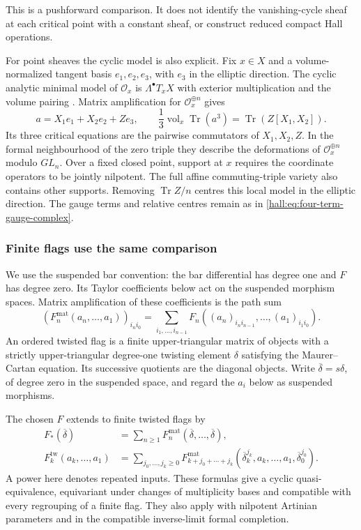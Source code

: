 This is a pushforward comparison. It does not identify the
vanishing-cycle sheaf at each critical point with a constant
sheaf, or construct reduced compact Hall operations.

For point sheaves the cyclic model is also explicit. Fix
$x\in X$ and a volume-normalized tangent basis $e_1,e_2,e_3$,
with $e_3$ in the elliptic direction. The cyclic analytic minimal
model of $\mathcal O_x$ is $\Lambda^\bullet T_xX$ with exterior
multiplication and the volume pairing
\cite[Theorem~4.23 and Proposition~5.18]{VanGarderenCyclic}.
Matrix amplification for $\mathcal O_x^{\oplus n}$ gives
\[
 a=X_1e_1+X_2e_2+Ze_3,\qquad
 \frac13\operatorname{vol}_x\operatorname{Tr}(a^3)
       =\operatorname{Tr}(Z[X_1,X_2]).
\]
Its three critical equations are the pairwise commutators of
$X_1,X_2,Z$. In the formal neighbourhood of the zero triple they
describe the deformations of $\mathcal O_x^{\oplus n}$ modulo
$GL_n$. Over a fixed closed point, support at $x$ requires the
coordinate operators to be jointly nilpotent. The full affine
commuting-triple variety also contains other supports.
Removing $\operatorname{Tr}Z/n$ centres this local model in the
elliptic direction. The gauge terms and relative centres remain
as in \eqref{hall:eq:four-term-gauge-complex}.

\subsubsection*{Finite flags use the same comparison}

We use the suspended bar convention: the bar differential has degree
one and $F$ has degree zero. Its Taylor coefficients below act on
the suspended morphism spaces. Matrix amplification of these
coefficients is the path sum
\[
 (F_n^{\mathrm{mat}}(a_n,\ldots,a_1))_{i_ni_0}
 =\sum_{i_1,\ldots,i_{n-1}}
 F_n((a_n)_{i_ni_{n-1}},\ldots,(a_1)_{i_1i_0}).
\]
An ordered twisted flag is a finite upper-triangular matrix of
objects with a strictly upper-triangular degree-one twisting element
$\delta$ satisfying the Maurer--Cartan equation. Its successive
quotients are the diagonal objects.
Write $\overline\delta=s\delta$, of degree zero in the suspended
space, and regard the $a_i$ below as suspended morphisms.

\begin{theorem}
\label{hall:thm:formal-flags}
The chosen $F$ extends to finite twisted flags by
\begin{align*}
 F_*(\overline\delta)
 &=\sum_{n\geq1}F_n^{\mathrm{mat}}
                  (\overline\delta,\ldots,\overline\delta),\\
 F_k^{\mathrm{tw}}(a_k,\ldots,a_1)
 &=\sum_{j_0,\ldots,j_k\geq0}
 F_{k+j_0+\cdots+j_k}^{\mathrm{mat}}
 (\overline\delta_k^{j_k},a_k,\ldots,a_1,\overline\delta_0^{j_0}).
\end{align*}
A power here denotes repeated inputs. These formulas give a cyclic
quasi-equivalence, equivariant under changes of multiplicity bases
and compatible with every regrouping of a finite flag. They also
apply with nilpotent Artinian parameters and in the compatible
inverse-limit formal completion.
\end{theorem}

